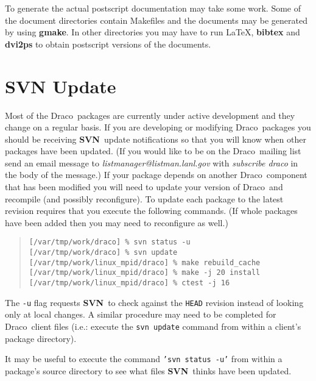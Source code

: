 \documentclass[11pt]{nmemo}
\newcommand{\comp}[1]{\normalfont\footnotesize\texttt{#1}\normalsize}
\newcommand{\draco}{{\normalfont\sffamily Draco}}
\newcommand{\svn}{{\normalfont\bfseries SVN}}
\begin{document}
To generate the actual postscript documentation may take some work.
Some of the document directories contain Makefiles and the documents
may be generated by using \textbf{gmake}.  In other directories you
may have to run \LaTeX, \textbf{bibtex} and \textbf{dvi2ps} to obtain
postscript versions of the documents.

\section{SVN Update}

Most of the \draco\ packages are currently under active development
and they change on a regular basis.  If you are developing or
modifying \draco\ packages you should be receiving \svn\ update
notifications so that you will know when other packages have been
updated.  (If you would like to be on the \draco\ mailing list send an
email message to \emph{listmanager@listman.lanl.gov} with
\emph{subscribe draco} in the body of the message.)  If your package
depends on another \draco\ component that has been modified you will
need to update your version of \draco\ and recompile (and possibly
reconfigure).  To update each package to the latest revision requires
that you execute the following commands.  (If whole packages have been
added then you may need to reconfigure as well.)

\footnotesize
\begin{verse}
\texttt{[/var/tmp/work/draco] \% svn status -u} \\
\texttt{[/var/tmp/work/draco] \% svn update} \\
\texttt{[/var/tmp/work/linux\_mpid/draco] \% make rebuild\_cache} \\
\texttt{[/var/tmp/work/linux\_mpid/draco] \% make -j 20 install} \\
\texttt{[/var/tmp/work/linux\_mpid/draco] \% ctest -j 16}
\end{verse}
\normalsize

The \comp{-u} flag requests \svn\ to check against the \comp{HEAD}
revision instead of looking only at local changes. A similar procedure
may need to be completed for \draco\ client files (i.e.: execute the
\comp{svn update} command from within a client's package directory).

It may be useful to execute the command \comp{'svn status -u'} from
within a package's source directory to see what files \svn\ thinks
have been updated.  
\end{document}
